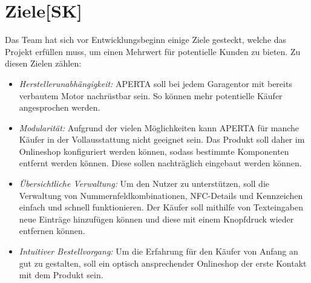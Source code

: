 \section{Ziele[SK]}
Das Team hat sich vor Entwicklungsbeginn einige Ziele gesteckt, welche das Projekt erfüllen muss, um einen Mehrwert für potentielle Kunden zu bieten. Zu diesen Zielen zählen:
\begin{itemize}
    \item \textit{Herstellerunabhängigkeit:} APERTA soll bei jedem Garagentor mit bereits verbautem Motor nachrüstbar sein. So können mehr potentielle Käufer angesprochen werden.
    \item \textit{Modularität:} Aufgrund der vielen Möglichkeiten kann APERTA für manche Käufer in der Vollausstattung nicht geeignet sein. Das Produkt soll daher im Onlineshop konfiguriert werden können, sodass bestimmte Komponenten entfernt werden können. Diese sollen nachträglich eingebaut werden können.
    \item \textit{Übersichtliche Verwaltung:} Um den Nutzer zu unterstützen, soll die Verwaltung von Nummernfeldkombinationen, NFC-Details und Kennzeichen einfach und schnell funktionieren. Der Käufer soll mithilfe von Texteingaben neue Einträge hinzufügen können und diese mit einem Knopfdruck wieder entfernen können.
    \item \textit{Intuitiver Bestellvorgang:}
    Um die Erfahrung für den Käufer von Anfang an gut zu gestalten, soll ein optisch ansprechender Onlineshop der erste Kontakt mit dem Produkt sein.
  \end{itemize}